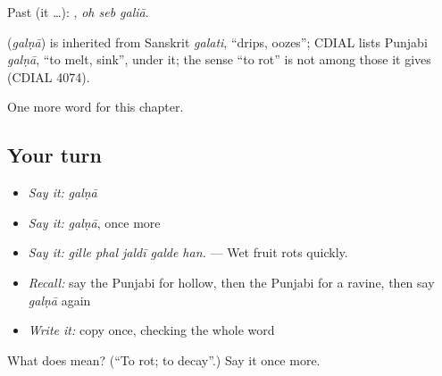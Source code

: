 Past (it …):   , \emph{oh seb galiā}.

\begin{cousinweb}
\textbf{} (\emph{galṇā}) is inherited from Sanskrit \emph{galati}, \textquotedblleft{}drips, oozes\textquotedblright{}; CDIAL lists Punjabi \emph{galṇā}, \textquotedblleft{}to melt, sink\textquotedblright{}, under it; the sense \textquotedblleft{}to rot\textquotedblright{} is not among those it gives (CDIAL 4074).
\end{cousinweb}

\begin{grammarlens}[title={What you've built}]
One more word for this chapter.
\end{grammarlens}

\subsection*{Your turn}
\begin{itemize}
\raggedright
  \item \emph{Say it:} \emph{galṇā}
  \item \emph{Say it:} \emph{galṇā}, once more
  \item \emph{Say it:} \emph{gille phal jaldī galde han.} — Wet fruit rots quickly.
  \item \emph{Recall:} say the Punjabi for hollow, then the Punjabi for a ravine, then say \emph{galṇā} again
  \item \emph{Write it:} copy \textbf{} once, checking the whole word
\end{itemize}

\begin{tcolorbox}[breakable,colback=teal!4,colframe=teal!35!black,title={Before you move on}]
What does  mean? (\textquotedblleft{}To rot; to decay\textquotedblright{}.) Say it once more.
\end{tcolorbox}
